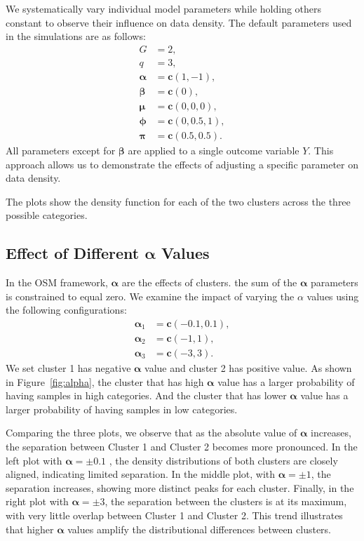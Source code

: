 \documentclass{article}
\begin{document}
We systematically vary individual model parameters while holding others constant to observe their influence on data density. The default parameters used in the simulations are as follows:
\[
\begin{aligned}
G &= 2, \\
q &= 3, \\
\bm{\alpha} &= \mathbf{c}(1, -1), \\
\bm{\beta} &= \mathbf{c}(0), \\
\bm{\mu} &= \mathbf{c}(0, 0, 0), \\
\bm{\phi} &= \mathbf{c}(0, 0.5, 1), \\
\bm{\pi} &= \mathbf{c}(0.5, 0.5).
\end{aligned}
\]
All parameters except for $\bm{\beta}$ are applied to a single outcome variable $Y$. This approach allows us to demonstrate the effects of adjusting a specific parameter on data density.

The plots show the density function for each of the two clusters across the three possible categories.

\subsection{Effect of Different $\bm{\alpha}$ Values}
In the OSM framework, $\bm{\alpha}$ are the effects of clusters. the sum of the $\bm{\alpha}$ parameters is constrained to equal zero. 
We examine the impact of varying the $\alpha$ values using the following configurations:
\[
\begin{aligned}
\bm{\alpha}_1 &= \mathbf{c}(-0.1, 0.1), \\
\bm{\alpha}_2 &= \mathbf{c}(-1, 1), \\ 
\bm{\alpha}_3 &= \mathbf{c}(-3, 3).
\end{aligned}
\]
We set cluster 1 has negative $\bm{\alpha}$ value and cluster 2 has positive value.
As shown in Figure~\ref{fig:alpha}, 
the cluster that has high $\bm{\alpha}$ value has a larger probability of having samples in high categories.
And the cluster that has lower $\bm{\alpha}$ value has a larger probability of having samples in low categories.

Comparing the three plots, we observe that as the absolute value of $\bm{\alpha}$ increases, the separation between Cluster 1 and Cluster 2 becomes more pronounced. In the left plot with $\bm{\alpha} = \pm 0.1$ , the density distributions of both clusters are closely aligned, indicating limited separation. In the middle plot, with $\bm{\alpha} = \pm 1$, the separation increases, showing more distinct peaks for each cluster. Finally, in the right plot with $\bm{\alpha} = \pm 3$, the separation between the clusters is at its maximum, with very little overlap between Cluster 1 and Cluster 2. This trend illustrates that higher $\bm{\alpha}$ values amplify the distributional differences between clusters.
\end{document}
